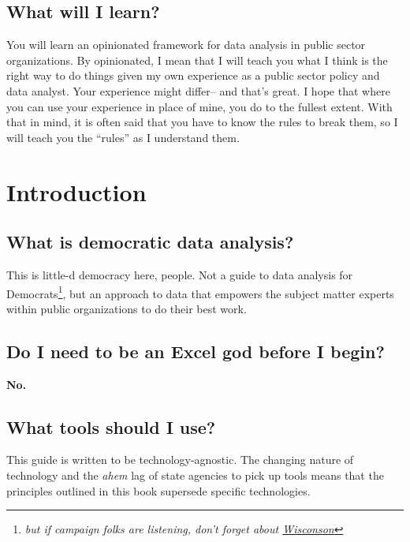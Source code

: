 \documentclass[]{book}
\begin{document}
\section*{What will I learn?}\label{what-will-i-learn}

You will learn an opinionated framework for data analysis in public
sector organizations. By opinionated, I mean that I will teach you what
I think is the right way to do things given my own experience as a
public sector policy and data analyst. Your experience might differ--
and that's great. I hope that where you can use your experience in place
of mine, you do to the fullest extent. With that in mind, it is often
said that you have to know the rules to break them, so I will teach you
the ``rules'' as I understand them.

\chapter{Introduction}\label{intro}

\section{What is democratic data
analysis?}\label{what-is-democratic-data-analysis}

This is little-d democracy here, people. Not a guide to data analysis
for Democrats\footnote{\emph{but if campaign folks are listening, don't
  forget about
  \href{https://blog.oup.com/2018/09/trump-beat-adas-big-data/}{Wisconson}}},
but an approach to data that empowers the subject matter experts within
public organizations to do their best work.

\section{Do I need to be an Excel god before I
begin?}\label{do-i-need-to-be-an-excel-god-before-i-begin}

\textbf{No.}

\section{What tools should I use?}\label{what-tools-should-i-use}

This guide is written to be technology-agnostic. The changing nature of
technology and the \emph{ahem} lag of state agencies to pick up tools
means that the principles outlined in this book supersede specific
technologies.
\end{document}
